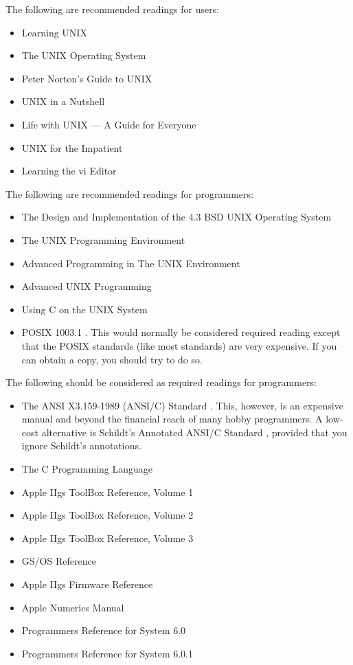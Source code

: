 \documentclass{report}
\begin{document}
The following are recommended readings for users:
\begin{itemize}
\item Learning UNIX \cite{gardner}
\item The UNIX Operating System \cite{christian}
\item Peter Norton's Guide to UNIX \cite{norton}
\item UNIX in a Nutshell \cite{gilly}
\item Life with UNIX --- A Guide for Everyone \cite{libes}
\item UNIX for the Impatient \cite{abrahams}
\item Learning the vi Editor \cite{lamb}
\end{itemize}

The following are recommended readings for programmers:
\begin{itemize}
\item The Design and Implementation of the 4.3 BSD UNIX Operating System \cite{leffler}
\item The UNIX Programming Environment \cite{kern_pike}
\item Advanced Programming in The UNIX Environment \cite{stevens}
\item Advanced UNIX Programming \cite{rochkind}
\item Using C on the UNIX System \cite{curry}
\item POSIX 1003.1 \cite{posix1}.  This would normally be considered
	required reading except that the POSIX standards (like most
	standards) are very expensive.  If you can obtain a copy, you
	should try to do so.
\end{itemize}

The following should be considered as required readings for programmers:
\begin{itemize}
\item The ANSI X3.159-1989 (ANSI/C) Standard \cite{ansic}.  This, however,
	is an expensive manual and beyond the financial reach of many
	hobby programmers.  A low-cost alternative is Schildt's
	Annotated ANSI/C Standard \cite{schildt}, provided that you 
	ignore Schildt's annotations.
\item The C Programming Language \cite{kern_ritchie}
\item Apple IIgs ToolBox Reference, Volume 1 \cite{tbr1}
\item Apple IIgs ToolBox Reference, Volume 2 \cite{tbr2}
\item Apple IIgs ToolBox Reference, Volume 3 \cite{tbr3}
\item GS/OS Reference \cite{gsos}
\item Apple IIgs Firmware Reference \cite{gsfirm}
\item Apple Numerics Manual \cite{numerics}
\item Programmers Reference for System 6.0 \cite{pr600}
\item Programmers Reference for System 6.0.1 \cite{pr601}
\end{itemize}
\end{document}
